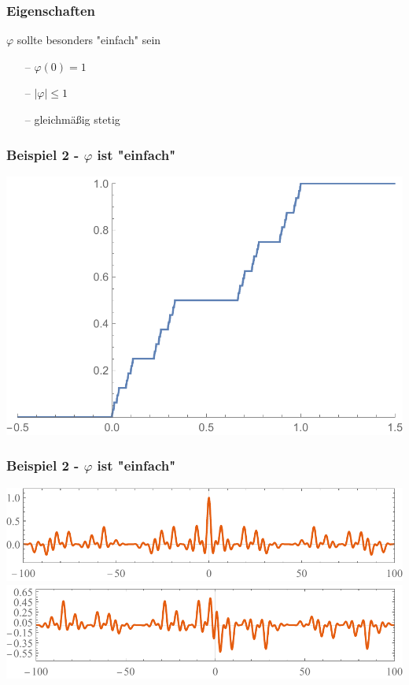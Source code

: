 \documentclass{beamer}
\begin{document}
\begin{frame}
\frametitle{Eigenschaften}
$\varphi$ sollte besonders "einfach" sein
\hfill \newline
\begin{itemize}
    \setlength\itemsep{1em}
    \item[--] $\varphi(0) = 1$
    \item[--] $|\varphi| \leq 1$
    \item[--] gleichmäßig stetig
\end{itemize}
\end{frame}

\begin{frame}
\frametitle{Beispiel 2 - $\varphi$ ist "einfach"}
\includegraphics[width=\linewidth, height=\textheight,keepaspectratio]{presentation/plots/cantor.pdf}
\end{frame}

\begin{frame}
\frametitle{Beispiel 2 - $\varphi$ ist "einfach"}
\includegraphics[width=\linewidth, height=.4\textheight,keepaspectratio]{presentation/plots/cantor_re.pdf}
\includegraphics[width=\linewidth, height=.4\textheight,keepaspectratio]{presentation/plots/cantor_im.pdf}
\end{frame}
\end{document}

